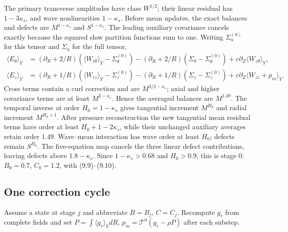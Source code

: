 \documentclass[10pt,a4paper]{article}
\begin{document}
The primary transverse amplitudes have class $W^{1/2}$; their linear residual
has $1-3\kappa_s$, and wave nonlinearities $1-\kappa_s$.  Before mean updates,
the exact balances and defects are $M^{1-\kappa_s}$ and $S^{1-\kappa_s}$.
The leading auxiliary covariance cancels exactly because the squared slow
partition functions sum to one.  Writing $\Sigma_a^{(0)}$ for this tensor and
$\Sigma_a$ for the full tensor,
\begin{align}
\langle E_\theta\rangle_Y&=(\partial_R+2/R)(\langle W_{r\theta}\rangle_Y-\Sigma_\theta^{(0)})
 -(\partial_R+2/R)(\Sigma_\theta-\Sigma_\theta^{(0)})+\varepsilon\partial_Z\langle W_{z\theta}\rangle_Y,\\
\langle E_z\rangle_Y&=(\partial_R+1/R)(\langle W_{rz}\rangle_Y-\Sigma_z^{(0)})
 -(\partial_R+1/R)(\Sigma_z-\Sigma_z^{(0)})+\varepsilon\partial_Z\langle W_{zz}+p_m\rangle_Y . 
\end{align}
Cross terms contain a curl correction and are $M^{3/2-\kappa_s}$; axial and
higher covariance terms are at least $M^{2-\kappa_s}$.  Hence the averaged
balances are $M^{1.49}$.  The temporal inverse at order
$H_0=1-\kappa_s$ gives tangential increment $M^{H_0}$ and radial increment
$M^{H_0+1}$. After pressure reconstruction the new tangential mean
residual terms have order at least $H_0+1-2\kappa_s$, while their
unchanged auxiliary averages retain order $1.49$. Wave--mean
interaction has wave order at least $H_0$; defects remain $S^{H_0}$.
The five-equation map
cancels the three linear defect contributions, leaving defects above
$1.8-\kappa_s$.  Since $1-\kappa_s>0.68$ and $H_0>0.9$, this is stage $0$:
$B_0=0.7$, $C_0=1.2$, with (9.9)--(9.10).

\subsection{One correction cycle}
\label{subsec:stage9-cycle}

Assume a state at stage $j$ and abbreviate $B=B_j$, $C=C_j$.  Recompute $g_r$
from complete fields and set $P=\int\langle g_r\rangle_YdR$,
$p_m=\mathcal T^0(g_r-\rho P)$ after each substep.
\end{document}
